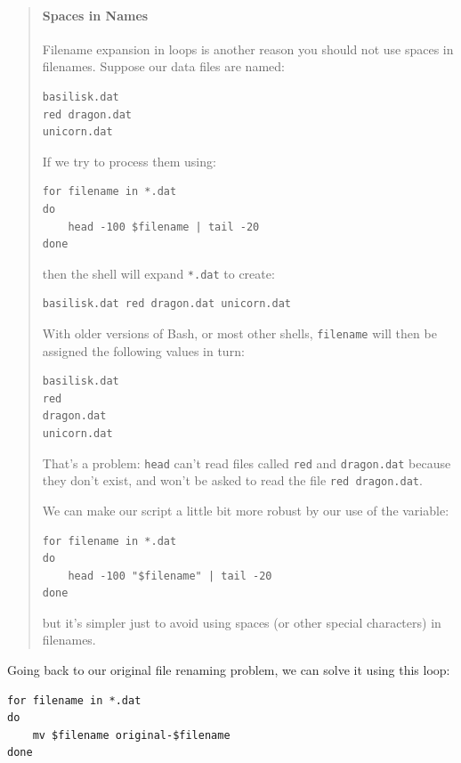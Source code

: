\documentclass{book}
\begin{document}
\begin{quote}
\mbox{}\paragraph{Spaces in Names}

Filename expansion in loops is another reason you should not use spaces
in filenames. Suppose our data files are named:

\begin{verbatim}
basilisk.dat
red dragon.dat
unicorn.dat
\end{verbatim}

If we try to process them using:

\begin{verbatim}
for filename in *.dat
do
    head -100 $filename | tail -20
done
\end{verbatim}

then the shell will expand \texttt{*.dat} to create:

\begin{verbatim}
basilisk.dat red dragon.dat unicorn.dat
\end{verbatim}

With older versions of Bash, or most other shells, \texttt{filename}
will then be assigned the following values in turn:

\begin{verbatim}
basilisk.dat
red
dragon.dat
unicorn.dat
\end{verbatim}

That's a problem: \texttt{head} can't read files called \texttt{red} and
\texttt{dragon.dat} because they don't exist, and won't be asked to read
the file \texttt{red dragon.dat}.

We can make our script a little bit more robust by
 our use of the variable:

\begin{verbatim}
for filename in *.dat
do
    head -100 "$filename" | tail -20
done
\end{verbatim}

but it's simpler just to avoid using spaces (or other special
characters) in filenames.
\end{quote}

Going back to our original file renaming problem, we can solve it using
this loop:

\begin{verbatim}
for filename in *.dat
do
    mv $filename original-$filename
done
\end{verbatim}
\end{document}
